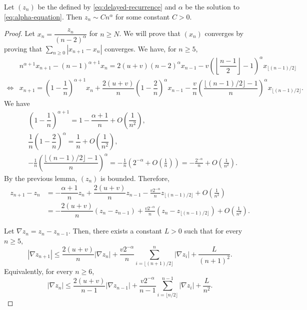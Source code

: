 \begin{theorem}
  \label{thm:exact-asymptotics}
  Let $(z_n)$ be the defined by \eqref{eq:delayed-recurrence} and $\alpha$ be the solution to \eqref{eq:alpha-equation}. Then $z_n\sim C n^\alpha$ for some constant $C > 0$.
\end{theorem}

\begin{proof}
  Let $x_n=\dfrac{z_n}{(n-2)^\alpha}$ for $n\ge N$. We will prove that $(x_n)$ converges by proving that $\sum_{n\ge 0}|x_{n+1}-x_n|$ converges. We have, for $n\ge 5$,
  \begin{align*}
         & n^{\alpha+1}x_{n+1} - (n-1)^{\alpha+1}x_n = 2(u+v)(n-2)^{\alpha}x_{n-1} - v\left(\left\lfloor \dfrac{n-1}{2}\right\rfloor-1\right)^{\alpha}x_{\lfloor (n-1)/2\rfloor}                                                 \\
    \iff & x_{n+1} = \left(1-\dfrac{1}{n}\right)^{\alpha+1}x_n + \dfrac{2(u+v)}{n}\left(1-\dfrac{2}{n}\right)^{\alpha}x_{n-1} - \dfrac{v}{n}\left(\dfrac{\lfloor (n-1)/2\rfloor-1}{n}\right)^{\alpha}x_{\lfloor (n-1)/2\rfloor}.
  \end{align*}
  We have
  \begin{align*}
     & \left(1-\dfrac{1}{n}\right)^{\alpha+1} = 1 - \dfrac{\alpha+1}{n} + O\left(\dfrac{1}{n^2}\right),                                                                                                  \\
     & \dfrac{1}{n}\left(1-\dfrac{2}{n}\right)^{\alpha} = \dfrac{1}{n} + O\left(\dfrac{1}{n^2}\right),                                                                                                   \\
     & -\frac{1}{n}\left(\dfrac{\lfloor (n-1)/2\rfloor-1}{n}\right)^{\alpha}=-\frac{1}{n} \left( 2^{-\alpha} + O\left(\frac{1}{n}\right) \right) = -\frac{2^{-\alpha}}{n} + O\left(\frac{1}{n^2}\right).
  \end{align*}
  By the previous lemma, $(z_n)$ is bounded. Therefore,
  \begin{align*}
    z_{n+1}-z_n
     & = -\dfrac{\alpha+1}{n}z_n + \dfrac{2(u+v)}{n}z_{n-1} - \frac{v2^{-\alpha}}{n}z_{\lfloor (n-1)/2\rfloor} + O\left(\frac{1}{n^2}\right) \\
     & = -\dfrac{2(u+v)}{n}(z_n-z_{n-1}) + \frac{v2^{-\alpha}}{n}(z_{n}-z_{\lfloor (n-1)/2\rfloor}) + O\left(\frac{1}{n^2}\right).
  \end{align*}

  Let $\nabla z_n = z_{n} - z_{n-1}$. Then, there exists a constant $L>0$ such that for every $n\ge 5$,
  $$|\nabla z_{n+1}| \le \dfrac{2(u+v)}{n}|\nabla z_{n}| + \frac{v2^{-\alpha}}{n}\sum_{i=\lfloor (n+1)/2\rfloor}^{n}|\nabla z_{i}| + \dfrac{L}{(n+1)^2}.$$
  Equivalently, for every $n\ge 6$,
  $$|\nabla z_n| \le \dfrac{2(u+v)}{n-1}|\nabla z_{n-1}| + \frac{v2^{-\alpha}}{n-1}\sum_{i=\lfloor n/2\rfloor}^{n-1}|\nabla z_{i}| + \dfrac{L}{n^2}.$$


\end{proof}
